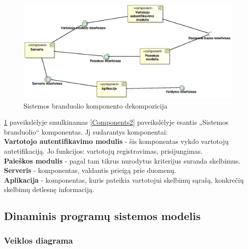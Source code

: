 \documentclass[12pt]{article}
\begin{document}
	\begin{figure}[h]
		\begin{center}
			\includegraphics[width=\textwidth]{Komponentai3.eps}
			\caption{Sistemos branduolio komponento dekompozicija\label{Components3}}
		\end{center}
	\end{figure}

	\ref{Components3} paveikslėlyje smulkinamas \ref{Components2} paveikslėlyje esantis „Sistemos branduolio“ komponentas. Jį sudarantys komponentai:\\
	
	\textbf{Vartotojo autentifikavimo modulis} - šis komponentas vykdo vartotojų autetifikaciją. Jo funkcijos: vartotojų registravimas, prisijungimas.\\
	
	\textbf{Paieškos modulis} - pagal tam tikrus nurodytus kriterijus suranda skelbimus.\\
	
	\textbf{Serveris} - komponentas, valdantis prieigą prie duomenų.\\
	
	\textbf{Aplikacija} - komponentas, kuris pateikia vartotojui skelbimų sąrašą, konkrečių skelbimų detlesnę informaciją.
	\pagebreak

	\subsection{Dinaminis programų sistemos modelis}
	\subsubsection{Veiklos diagrama}
	
\end{document}
